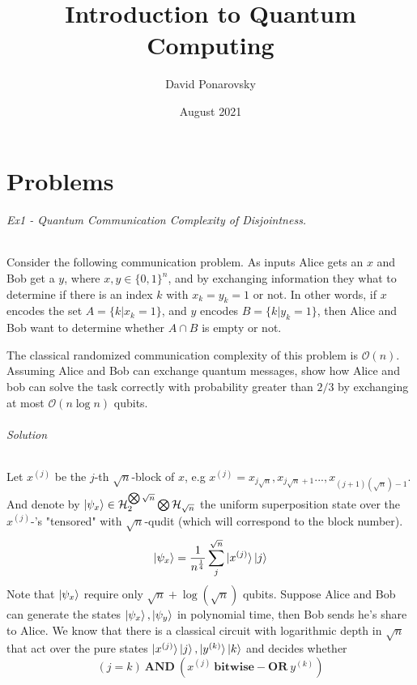 \documentclass{article}
\title{Introduction to Quantum Computing}
\author{David Ponarovsky}
\date{August 2021}
\newcommand{\onotation}[1]{\(\mathcal{O} \left( {#1}  \right) \)}
\newcommand{\ona}[1]{\onotation{#1}}
\begin{document}
\graphicspath{ {./images/} }
\maketitle

\part{ Problems }

\paragraph{Ex1 - Quantum Communication Complexity of Disjointness.}
Consider the following communication
problem. As inputs Alice gets an \(x\) and Bob get a \(y\), where \(x, y \in \{0, 1\}^n \), and by exchanging information they what to determine if there is an index \(k\) with \(x_k = y_k = 1 \) or not. 
In other words, if \(x\) encodes the
set \(A = \{k | x_k = 1\} \), and \(y\) encodes \(B = \{k | y_k = 1\}\), then Alice and Bob want to determine whether \( A \cap B \) is empty or not.

The classical randomized communication complexity of this problem is \ona{n}.
Assuming Alice and Bob can exchange quantum messages, show how Alice and bob can solve the task
correctly with probability greater than \(2/3\) by exchanging at most \ona{n\log n } qubits.

\paragraph{Solution} Let \( x^{(j)} \) be the \(j\)-th \(\sqrt{n}\)-block of \(x\), e.g \(x^{(j)} = x_{j\sqrt{n}},x_{j\sqrt{n}+1}...,x_{(j+1)(\sqrt{n})-1}  \). And denote by \( \ket{\psi_x} \in \mathcal{H}_{2}^{\bigotimes \sqrt{n}} \bigotimes \mathcal{H}_{\sqrt{n}} \) the uniform superposition state over the \( x^{(j)}\)-'s "tensored" with \(\sqrt{n}\)-qudit (which will correspond to the block number).  \[ \ket{\psi_x} = \frac{1}{n^\frac{1}{4}}\sum_{j}^{\sqrt{n}}\ket{x^{(j)}}\ket{j} \] Note that \( \ket{\psi_x} \) require only \( \sqrt{n} + \log(\sqrt{n}) \) qubits. Suppose Alice and Bob can generate the states \( \ket{\psi_x}, \ket{\psi_y} \) in polynomial time, then Bob sends he's share to Alice. We know that there is a classical circuit with logarithmic depth in \( \sqrt{n} \) that act over the pure states \( \ket{x^{(j)}}\ket{j} , \ket{y^{(k)}}\ket{k} \) and decides whether \[ \left( j =  k \right) \ \mathbf{AND}  \ \left( x^{(j)} \ \mathbf{bitwise-OR} \  y^{(k)} \right)   \]
\end{document}
